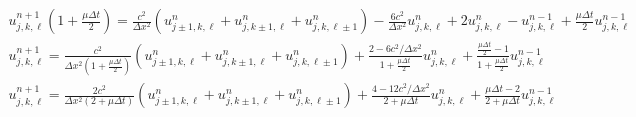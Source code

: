 \documentclass{article}
\begin{document}
$$\begin{aligned}
	u_{j, k, \ell}^{n+1} (1 + \frac{\mu \Delta t}{2}) = \frac{c^2}{\Delta x^2} \left(u_{j \pm 1, k, \ell}^n + u_{j, k \pm 1, \ell}^n + u_{j, k, \ell \pm 1}^n \right) - \frac{6 c^2}{\Delta x^2} u_{j,k,\ell}^n + 2u_{j,k,\ell}^n - u_{j,k,\ell}^{n-1} + \frac{\mu \Delta t}{2} u_{j, k, \ell}^{n-1} \\
	u_{j, k, \ell}^{n+1} = \frac{c^2}{\Delta x^2(1 + \frac{\mu \Delta t}{2})} \left(u_{j \pm 1, k, \ell}^n + u_{j, k \pm 1, \ell}^n + u_{j, k, \ell \pm 1}^n \right) + \frac{2-6c^2 / \Delta x^2}{1 + \frac{\mu \Delta t}{2}} u_{j,k,\ell}^n + \frac{\frac{\mu \Delta t}{2} - 1}{1 + \frac{\mu \Delta t}{2}} u_{j, k, \ell}^{n-1} \\
	u_{j, k, \ell}^{n+1} = \frac{2 c^2}{\Delta x^2(2 + \mu \Delta t)} \left(u_{j \pm 1, k, \ell}^n + u_{j, k \pm 1, \ell}^n + u_{j, k, \ell \pm 1}^n \right) + \frac{4-12c^2 / \Delta x^2}{2 + \mu \Delta t} u_{j,k,\ell}^n + \frac{\mu \Delta t - 2}{2 + \mu \Delta t} u_{j, k, \ell}^{n-1} \\
\end{aligned}
$$
\end{document}
